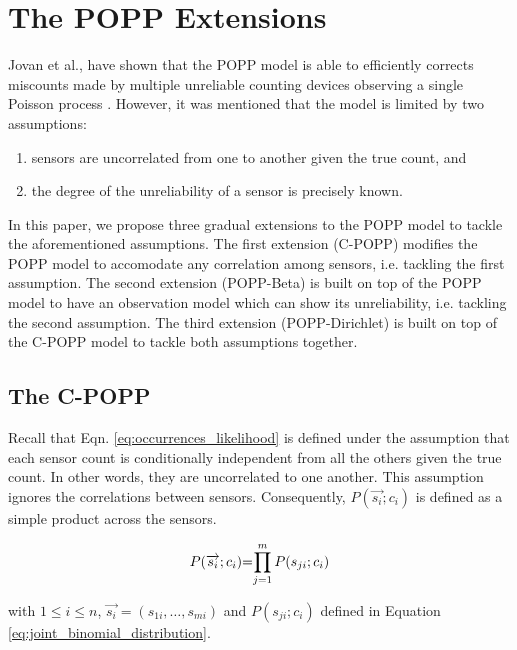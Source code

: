 \section{The POPP Extensions}
\label{sec:popp_extensions}

Jovan et al., have shown that the POPP model is able to efficiently corrects miscounts made by multiple unreliable counting devices observing a single Poisson process \cite{jovan18a} . However, it was mentioned that the model is limited by two assumptions:
\begin{enumerate}
    \item sensors are uncorrelated from one to another given the true count, and 
    \item the degree of the unreliability of a sensor is precisely known.
\end{enumerate}
In this paper, we propose three gradual extensions to the POPP model to tackle the aforementioned assumptions. The first extension (C-POPP) modifies the POPP model to accomodate any correlation among sensors, i.e. tackling the first assumption. The second extension (POPP-Beta) is built on top of the POPP model to have an observation model which can show its unreliability, i.e. tackling the second assumption. The third extension (POPP-Dirichlet) is built on top of the C-POPP model to tackle both assumptions together. 

\subsection{The C-POPP}
\label{subsec:cpop}

Recall that Eqn. \ref{eq:occurrences_likelihood} is defined under the assumption that each sensor count is conditionally independent from all the others given the true count. In other words, they are uncorrelated to one another. This assumption ignores the correlations between sensors. Consequently, $P(\overrightarrow{s_i} ; c_i)$ is defined as a simple product across the sensors. 

\begin{equation}
	\label{eq:independent_sensor_likelihood}
	\begin{tabular}{r@{=}l}
	$P(\overrightarrow{s_i} ; c_i)$ & $\displaystyle\prod_{j=1}^{m} P(s_{ji} ; c_i)$ \\ 
	\end{tabular}
\end{equation}

\noindent with $1 \leq i \leq n$, $\overrightarrow{s_i} = (s_{1i}, \ldots, s_{mi})$ and $P(s_{ji} ; c_i)$ defined in Equation \ref{eq:joint_binomial_distribution}.

